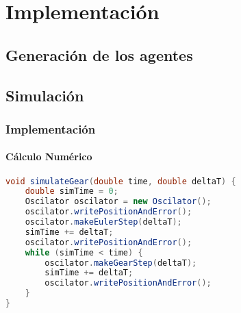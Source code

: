 \documentclass[hyperref={pdfpagelayout=SinglePage}]{beamer}
\begin{document}
\section{Implementación}

\subsection{Generación de los agentes}


\subsection{Simulación}


\begin{frame}[fragile]
\frametitle{Implementación}
\framesubtitle{Cálculo Numérico}
\begin{lstlisting}[language=Java, caption = Método de Gear Predictor Corrector.]
void simulateGear(double time, double deltaT) {
	double simTime = 0;
    Oscilator oscilator = new Oscilator();
	oscilator.writePositionAndError();
    oscilator.makeEulerStep(deltaT);
    simTime += deltaT;
	oscilator.writePositionAndError();
    while (simTime < time) {
    	oscilator.makeGearStep(deltaT);
        simTime += deltaT;
		oscilator.writePositionAndError();
    }
}
\end{lstlisting}
\end{frame}
\end{document}
